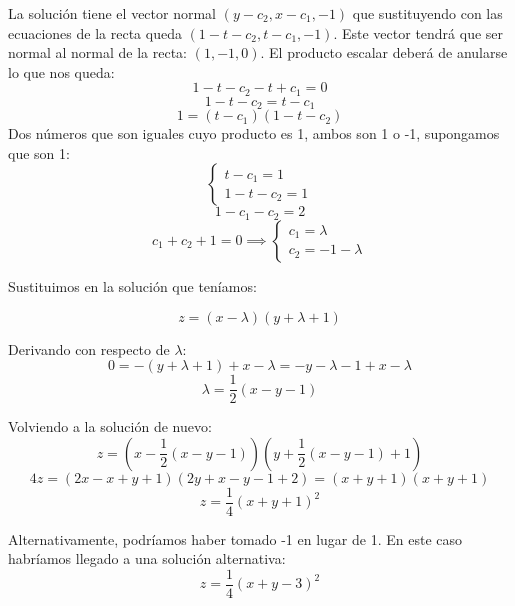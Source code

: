 \documentclass[openany]{book}
\begin{document}
\begin{exercise}
      La solución tiene el vector normal $ (y-c_2,x-c_1,-1) $ que sustituyendo con las ecuaciones de la recta queda $ (1-t-c_2,t-c_1,-1) $. Este vector tendrá que ser normal al normal de la recta: $ (1,-1,0) $. El producto escalar deberá de anularse lo que nos queda:
      $$ 1-t-c_2-t+c_1 = 0  $$
      $$ 1-t-c_2=t-c_1 $$
      $$ 1 = (t-c_1)(1-t-c_2) $$
      Dos números que son iguales cuyo producto es 1, ambos son 1 o -1, supongamos que son 1:
      $$ \left\{
      \begin{array}{l}
        t-c_1 = 1\\ 
        1-t-c_2 = 1
      \end{array}
      \right. $$
      $$  1-c_1-c_2 = 2 $$
      $$ c_1+c_2+1 = 0 \implies \left\{
      \begin{array}{l}
        c_1 = \lambda\\ 
        c_2 = -1-\lambda 
      \end{array}
      \right.$$

      Sustituimos en la solución que teníamos:
      
      $$ z = (x-\lambda)(y+\lambda +1) $$

      Derivando con respecto de $ \lambda $:
      $$  0 = -(y+\lambda +1 )+ x -\lambda = -y-\lambda-1+x-\lambda $$
      $$  \lambda = \dfrac{1}{2}(x-y-1) $$

      Volviendo a la solución de nuevo:
      $$ z = (x-\dfrac{1}{2}(x-y-1))(y+\dfrac{1}{2}(x-y-1)+1) $$
      $$ 4z = (2x-x+y+1)(2y+x-y-1+2)=(x+y+1)(x+y+1) $$
      $$ z = \dfrac{1}{4}(x+y+1)^2 $$

      Alternativamente, podríamos haber tomado -1 en lugar de 1. En este caso habríamos llegado a una solución alternativa:
      $$ z = \dfrac{1}{4}(x+y-3)^2 $$



\end{exercise}

\setcounter{ex}{3}
\end{document}
